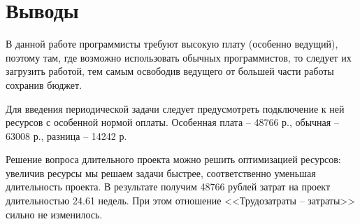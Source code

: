 \chapter{Выводы}

В данной работе программисты требуют высокую плату (особенно ведущий), поэтому там, где возможно использовать обычных программистов, то следует их загрузить работой, тем самым освободив ведущего от большей части работы сохранив бюджет.

Для введения периодической задачи следует предусмотреть подключение к ней ресурсов с особенной нормой оплаты. Особенная плата -- 48766 р., обычная -- 63008 р., разница -- 14242 р.

Решение вопроса длительного проекта можно решить оптимизацией ресурсов: увеличив ресурсы мы решаем задачи быстрее, соответственно уменьшая длительность проекта. В результате получим 48766 рублей затрат на проект длительностью 24.61 недель. При этом отношение <<Трудозатраты -- затраты>> сильно не изменилось.